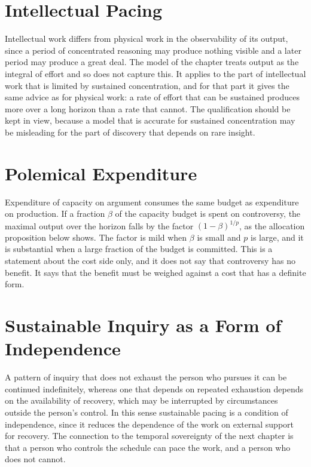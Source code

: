 \documentclass[11pt,letterpaper]{report}
\theoremstyle{plain}
\theoremstyle{definition}
\theoremstyle{remark}
\begin{document}
\section{Intellectual Pacing}

Intellectual work differs from physical work in the observability of its output, since a period of concentrated reasoning may produce nothing visible and a later period may produce a great deal. The model of the chapter treats output as the integral of effort and so does not capture this. It applies to the part of intellectual work that is limited by sustained concentration, and for that part it gives the same advice as for physical work: a rate of effort that can be sustained produces more over a long horizon than a rate that cannot. The qualification should be kept in view, because a model that is accurate for sustained concentration may be misleading for the part of discovery that depends on rare insight.

\section{Polemical Expenditure}

Expenditure of capacity on argument consumes the same budget as expenditure on production. If a fraction $\beta$ of the capacity budget is spent on controversy, the maximal output over the horizon falls by the factor $(1-\beta)^{1/p}$, as the allocation proposition below shows. The factor is mild when $\beta$ is small and $p$ is large, and it is substantial when a large fraction of the budget is committed. This is a statement about the cost side only, and it does not say that controversy has no benefit. It says that the benefit must be weighed against a cost that has a definite form.

\section{Sustainable Inquiry as a Form of Independence}

A pattern of inquiry that does not exhaust the person who pursues it can be continued indefinitely, whereas one that depends on repeated exhaustion depends on the availability of recovery, which may be interrupted by circumstances outside the person's control. In this sense sustainable pacing is a condition of independence, since it reduces the dependence of the work on external support for recovery. The connection to the temporal sovereignty of the next chapter is that a person who controls the schedule can pace the work, and a person who does not cannot.
\end{document}
